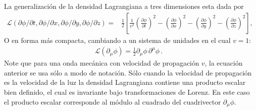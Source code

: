 \begin{frame}
La generalización de la densidad Lagrangiana a tres dimensiones esta dada por
\begin{align}
  \label{eq:dlc3d}
  \mathcal{L}(\partial\phi/\partial t,\partial\phi/\partial x,\partial\phi/\partial y,\partial\phi/\partial z)
=&\frac{1}{2}
\left[
  \frac{1}{v^2}\left(\frac{\partial\phi}{\partial t}\right)^2-\left(\frac{\partial\phi}{\partial x}\right)^2-\left(\frac{\partial\phi}{\partial y}\right)^2-\left(\frac{\partial\phi}{\partial z}\right)^2
\right],
\end{align}
O en forma más compacta, cambiando a un sistema de unidades en el cual $v=1$:
\begin{align}
  \mathcal{L}(\partial_{\mu} \phi)=  \frac{1}{2}{\partial_\mu\phi}\,{\partial^\mu\phi}\,.
\end{align}
Note que para una onda mecánica con velocidad de propagación $v$, la ecuación anterior se usa sólo a modo de notación. Sólo cuando la velocidad de propagación es la velocidad de la luz la densidad Lagrangiana contiene una producto escalar bien definido, el cual es invariante bajo transformaciones de Lorenz. En este caso el producto escalar corresponde al módulo al cuadrado del cuadrivector $\partial_{\mu}\phi$.
\end{frame}

